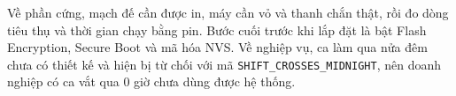 \documentclass[../DoAn.tex]{subfiles}
\begin{document}
Về phần cứng, mạch đế cần được in, máy cần vỏ và thanh chắn thật, rồi đo dòng tiêu thụ và thời gian chạy bằng pin. Bước
cuối trước khi lắp đặt là bật Flash Encryption, Secure Boot và mã hóa NVS. Về nghiệp vụ, ca làm qua nửa đêm chưa có thiết
kế và hiện bị từ chối với mã \texttt{SHIFT\_CROSSES\_MIDNIGHT}, nên doanh nghiệp có ca vắt qua 0 giờ chưa dùng được hệ thống.
\end{document}
